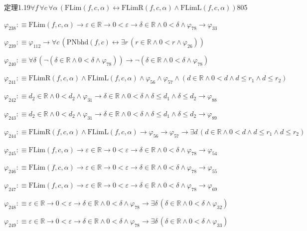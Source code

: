 \begin{fullproof}{定理1.19}{$\forall f\,\forall c\,\forall \alpha\,(\mathrm{FLim}(f,c,\alpha) \leftrightarrow \mathrm{FLimR}(f,c,\alpha) \land \mathrm{FLimL}(f,c,\alpha))$}{805}
\begin{abbrevlist}
\item $\varphi_{238} :\equiv \mathrm{FLim}(f,c,\alpha) \to \varepsilon \in \mathbb{R} \to 0 < \varepsilon \to \delta \in \mathbb{R} \land 0 < \delta \land \varphi_{78} \to \varphi_{33}$
\item $\varphi_{239} :\equiv \varphi_{112} \to \forall c\,(\mathrm{PNbhd}(f,c) \leftrightarrow \exists r\,(r \in \mathbb{R} \land 0 < r \land \varphi_{26}))$
\item $\varphi_{240} :\equiv \forall \delta\,(\neg (\delta \in \mathbb{R} \land 0 < \delta \land \varphi_{78})) \to \neg (\delta \in \mathbb{R} \land 0 < \delta \land \varphi_{78})$
\item $\varphi_{241} :\equiv \mathrm{FLimR}(f,c,\alpha) \land \mathrm{FLimL}(f,c,\alpha) \land \varphi_{56} \land \varphi_{57} \land (d \in \mathbb{R} \land 0 < d \land d \leq r_{1} \land d \leq r_{2})$
\item $\varphi_{242} :\equiv d_{2} \in \mathbb{R} \land 0 < d_{2} \land \varphi_{31} \to \delta \in \mathbb{R} \land 0 < \delta \land \delta \leq d_{1} \land \delta \leq d_{2} \to \varphi_{88}$
\item $\varphi_{243} :\equiv d_{2} \in \mathbb{R} \land 0 < d_{2} \land \varphi_{31} \to \delta \in \mathbb{R} \land 0 < \delta \land \delta \leq d_{1} \land \delta \leq d_{2} \to \varphi_{89}$
\item $\varphi_{244} :\equiv \mathrm{FLimR}(f,c,\alpha) \land \mathrm{FLimL}(f,c,\alpha) \to \varphi_{56} \to \varphi_{57} \to \exists d\,(d \in \mathbb{R} \land 0 < d \land d \leq r_{1} \land d \leq r_{2})$
\item $\varphi_{245} :\equiv \mathrm{FLim}(f,c,\alpha) \to \varepsilon \in \mathbb{R} \to 0 < \varepsilon \to \delta \in \mathbb{R} \land 0 < \delta \land \varphi_{78} \to \varphi_{54}$
\item $\varphi_{246} :\equiv \mathrm{FLim}(f,c,\alpha) \to \varepsilon \in \mathbb{R} \to 0 < \varepsilon \to \delta \in \mathbb{R} \land 0 < \delta \land \varphi_{78} \to \varphi_{55}$
\item $\varphi_{247} :\equiv \mathrm{FLim}(f,c,\alpha) \to \varepsilon \in \mathbb{R} \to 0 < \varepsilon \to \delta \in \mathbb{R} \land 0 < \delta \land \varphi_{78} \to \varphi_{69}$
\item $\varphi_{248} :\equiv \varepsilon \in \mathbb{R} \to 0 < \varepsilon \to \delta \in \mathbb{R} \land 0 < \delta \land \varphi_{78} \to \exists \delta\,(\delta \in \mathbb{R} \land 0 < \delta \land \varphi_{32})$
\item $\varphi_{249} :\equiv \varepsilon \in \mathbb{R} \to 0 < \varepsilon \to \delta \in \mathbb{R} \land 0 < \delta \land \varphi_{78} \to \exists \delta\,(\delta \in \mathbb{R} \land 0 < \delta \land \varphi_{33})$

\end{abbrevlist}
\end{fullproof}
